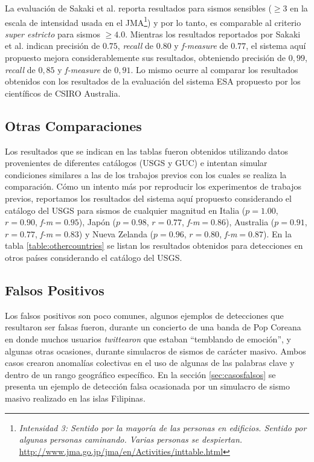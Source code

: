 La evaluación de Sakaki et al. reporta resultados para sismos sensibles ($\geq 3$ en la escala de intensidad usada en el JMA\footnote{{\em Intensidad 3: Sentido por la mayoría de las personas en edificios. Sentido por algunas personas caminando. Varias personas se despiertan.} \url{http://www.jma.go.jp/jma/en/Activities/inttable.html} }) y por lo tanto, es comparable al criterio {\em super estricto} para sismos $\geq 4.0$. Mientras los resultados reportados por Sakaki et al. indican precisión de $0.75$, {\em recall} de $0.80$ y {\em f-measure} de $0.77$, el sistema aquí propuesto mejora considerablemente sus resultados, obteniendo precisión de $0,99$, {\em recall} de $0,85$ y {\em f-measure} de $0,91$. Lo mismo ocurre al comparar los resultados obtenidos con los resultados de la evaluación del sistema ESA propuesto por los científicos de CSIRO Australia.  

\subsection{Otras Comparaciones}

Los resultados que se indican en las tablas fueron obtenidos utilizando datos provenientes de diferentes catálogos (USGS y GUC) e intentan simular condiciones similares a las de los trabajos previos con los cuales se realiza la comparación.
%
Cómo un intento más por reproducir los experimentos de trabajos previos, reportamos los resultados del sistema aquí propuesto considerando el catálogo del USGS para sismos de cualquier magnitud en Italia ($p=1.00$, $r=0.90$, {\em f-m}$=0.95$), Japón ($p=0.98$, $r=0.77$, {\em f-m}$=0.86$), Australia ($p=0.91$, $r=0.77$, {\em f-m}$=0.83$) y Nueva Zelanda ($p=0.96$, $r=0.80$, {\em f-m}$=0.87$).
%
En la tabla \ref{table:othercountries} se listan los resultados obtenidos para detecciones en otros países considerando el catálogo del USGS.

 
\subsection{Falsos Positivos}

Los falsos positivos son poco comunes, algunos ejemplos de detecciones que resultaron ser falsas fueron, durante un concierto de una banda de Pop Coreana en donde muchos usuarios \textit{twittearon} que estaban ``temblando de emoción'', y algunas otras ocasiones, durante simulacros de sismos de carácter masivo. Ambos casos crearon anomalías colectivas en el uso de algunas de las palabras clave y dentro de un rango geográfico específico. En la sección \ref{sec:casosfalsos} se presenta un ejemplo de detección falsa ocasionada por un simulacro de sismo masivo realizado en las islas Filipinas. 

